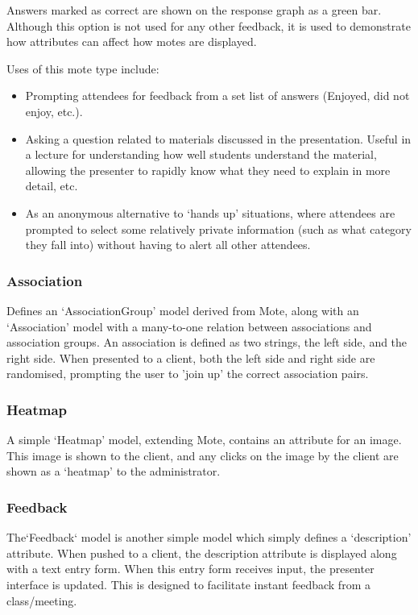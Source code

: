 \documentclass[a4papert,11pt,notitlepage]{ltxdoc}
\begin{document}
Answers marked as correct are shown on the response graph as a green bar. Although this option is not used for any other feedback, it is used to demonstrate how attributes can affect how motes are displayed.

Uses of this mote type include:
\begin{itemize}
\item Prompting attendees for feedback from a set list of answers (Enjoyed, did not enjoy, etc.). 
\item Asking a question related to materials discussed in the presentation. Useful in a lecture for understanding how well students understand the material, allowing the presenter to rapidly know what they need to explain in more detail, etc.
\item As an anonymous alternative to `hands up' situations, where attendees are prompted to select some relatively private information (such as what category they fall into) without having to alert all other attendees.
\end{itemize}

\subsubsection{Association}
Defines an `AssociationGroup' model derived from Mote, along with an `Association' model with a many-to-one relation between associations and association groups. An association is defined as two strings, the left side, and the right side. When presented to a client, both the left side and right side are randomised, prompting the user to 'join up' the correct association pairs.

\subsubsection{Heatmap}
A simple `Heatmap' model, extending Mote, contains an attribute for an image. This image is shown to the client, and any clicks on the image by the client are shown as a `heatmap' to the administrator.

\subsubsection{Feedback}
The`Feedback` model is another simple model which simply defines a `description' attribute. When pushed to a client, the description attribute is displayed along with a text entry form. When this entry form receives input, the presenter interface is updated. This is designed to facilitate instant feedback from a class/meeting.
\end{document}
